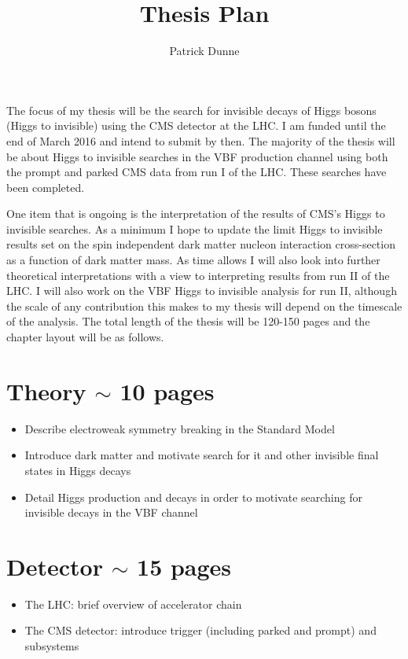 \documentclass[12pt]{article}
\begin{document}
\title{Thesis Plan}
\author{Patrick Dunne}

\maketitle
The focus of my thesis will be the search for invisible decays of Higgs bosons (Higgs to invisible) using the CMS detector at the LHC. I am funded until the end of March 2016 and intend to submit by then. The majority of the thesis will be about Higgs to invisible searches in the VBF production channel using both the prompt and parked CMS data from run I of the LHC. These searches have been completed.

One item that is ongoing is the interpretation of the results of CMS's Higgs to invisible searches. As a minimum I hope to update the limit Higgs to invisible results set on the spin independent dark matter nucleon interaction cross-section as a function of dark matter mass. As time allows I will also look into further theoretical interpretations with a view to interpreting results from run II of the LHC. I will also work on the VBF Higgs to invisible analysis for run II, although the scale of any contribution this makes to my thesis will depend on the timescale of the analysis. The total length of the thesis will be 120-150 pages and the chapter layout will be as follows.

\section{Theory $\sim$ 10 pages}
\begin{itemize}
\label{sec:theory}
\item Describe electroweak symmetry breaking in the Standard Model
\item Introduce dark matter and motivate search for it and other invisible final states in Higgs decays
\item Detail Higgs production and decays in order to motivate searching for invisible decays in the VBF channel
\end{itemize}

\section{Detector $\sim$ 15 pages}
\begin{itemize}
\label{sec:detector}
\item The LHC: brief overview of accelerator chain
\item The CMS detector: introduce trigger (including parked and prompt) and subsystems
\end{itemize}
\end{document}
